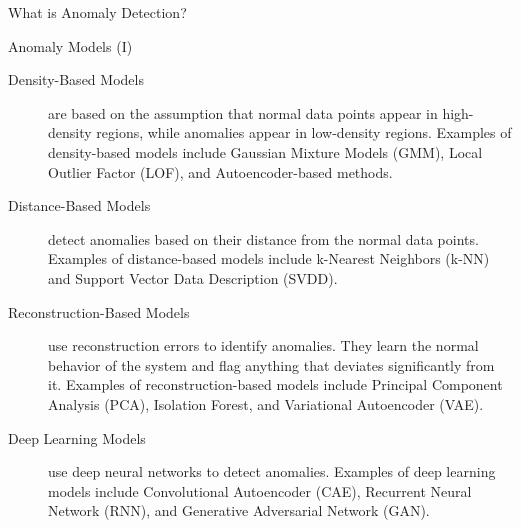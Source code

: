 \documentclass[aspectratio=169]{../latex_main/tntbeamer}  %
\begin{document}
\begin{frame}[c]{What is Anomaly Detection?}
        
        
        
        

    \end{frame}

    

    \begin{frame}[c]{Anomaly Models (I)}
        \begin{description}
            \item[Density-Based Models] are based on the assumption that normal data points appear in high-density regions, while anomalies appear in low-density regions. Examples of density-based models include Gaussian Mixture Models (GMM), Local Outlier Factor (LOF), and Autoencoder-based methods.
            \pause
            \item[Distance-Based Models] detect anomalies based on their distance from the normal data points. Examples of distance-based models include k-Nearest Neighbors (k-NN) and Support Vector Data Description (SVDD).
            \pause
            \item[Reconstruction-Based Models] use reconstruction errors to identify anomalies. They learn the normal behavior of the system and flag anything that deviates significantly from it. Examples of reconstruction-based models include Principal Component Analysis (PCA), Isolation Forest, and Variational Autoencoder (VAE).
            \pause
            \item[Deep Learning Models] use deep neural networks to detect anomalies. Examples of deep learning models include Convolutional Autoencoder (CAE), Recurrent Neural Network (RNN), and Generative Adversarial Network (GAN).

        \end{description}

    \end{frame}
\end{document}
